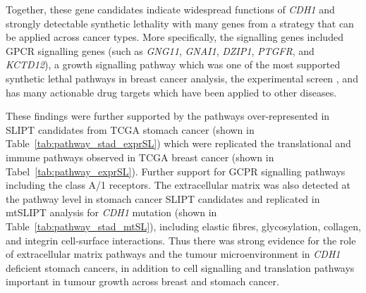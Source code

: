 Together, these gene candidates indicate widespread functions of \textit{CDH1} and strongly detectable synthetic lethality with many genes from a strategy that can be applied across cancer types. More specifically, the signalling genes included GPCR signalling genes (such as \textit{GNG11}, \textit{GNAI1}, \textit{DZIP1}, \textit{PTGFR}, and \textit{KCTD12}), a growth signalling pathway which was one of the most supported synthetic lethal pathways in breast cancer analysis, the experimental screen \citep{Telford2015}, and has many actionable drug targets which have been applied to other diseases.

These findings were further supported by the pathways over-represented in SLIPT candidates from TCGA stomach cancer (shown in Table~\ref{tab:pathway_stad_exprSL}) which were replicated the translational and immune pathways observed in TCGA breast cancer (shown in Tabel~\ref{tab:pathway_exprSL}). Further support for GCPR signalling pathways including the class A/1 receptors. The extracellular matrix was also detected at the pathway level in stomach cancer SLIPT candidates and replicated in mtSLIPT analysis for \textit{CDH1} mutation (shown in Table~\ref{tab:pathway_stad_mtSL}), including elastic fibres, glycosylation, collagen, and integrin cell-surface interactions. Thus there was strong evidence for the role of extracellular matrix pathways and the tumour microenvironment in \textit{CDH1} deficient stomach cancers, in addition to cell signalling and translation pathways important in tumour growth across breast and stomach cancer.


